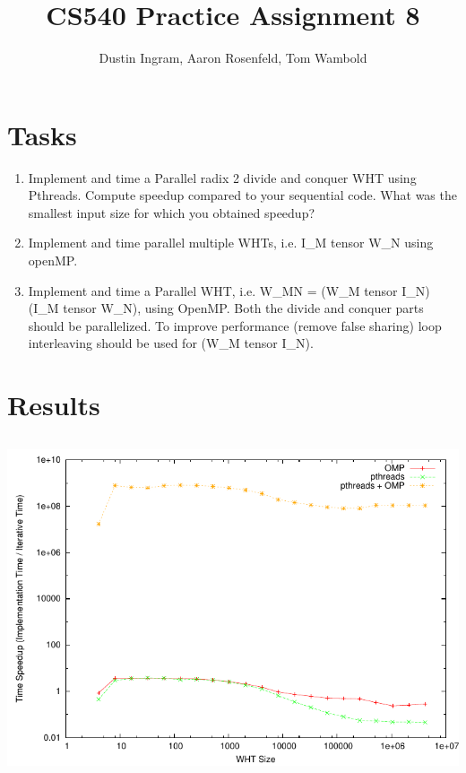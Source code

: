 \documentclass{article}
\title{CS540 Practice Assignment 8}
\author{Dustin Ingram, Aaron Rosenfeld, Tom Wambold}
\begin{document}
\maketitle
\newpage
\section{Tasks}
\begin{enumerate}
    \item Implement and time a Parallel radix 2 divide and conquer WHT using Pthreads. Compute speedup compared to your sequential code. What was the smallest input size for which you obtained speedup?
    \item Implement and time parallel multiple WHTs, i.e. I\_M tensor W\_N using openMP.
    \item Implement and time a Parallel WHT, i.e. W\_MN = (W\_M tensor I\_N)(I\_M tensor W\_N), using OpenMP. Both the divide and conquer parts should be parallelized. To improve performance (remove false sharing) loop interleaving should be used for (W\_M tensor I\_N).
\end{enumerate}
\section{Results}
\subsection{}
  \includegraphics[width=\textwidth]{p8.pdf}
\end{document}
